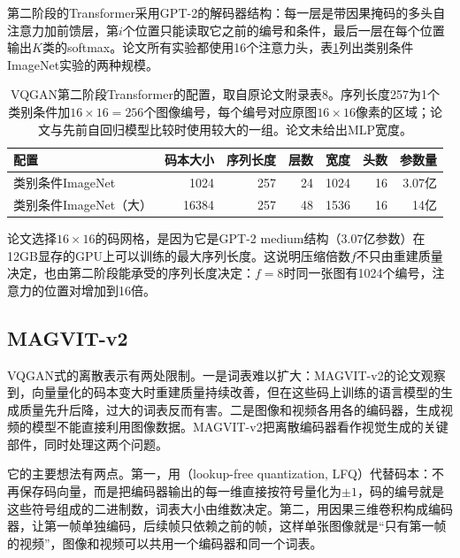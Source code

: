第二阶段的Transformer采用GPT-2的解码器结构：每一层是带因果掩码的多头自注意力加前馈层，第$i$个位置只能读取它之前的编号和条件，最后一层在每个位置输出$K$类的softmax。论文所有实验都使用16个注意力头，表\ref{tab:vision-ivm-vqgan-transformer}列出类别条件ImageNet实验的两种规模。

\begin{table}[tbp]
  \centering
  \small
  \begin{tabular}{@{}lrrrrrr@{}}
    \toprule
    配置 & 码本大小 & 序列长度 & 层数 & 宽度 & 头数 & 参数量\\
    \midrule
    类别条件ImageNet & 1024 & 257 & 24 & 1024 & 16 & 3.07亿\\
    类别条件ImageNet（大） & 16384 & 257 & 48 & 1536 & 16 & 14亿\\
    \bottomrule
  \end{tabular}
  \caption{VQGAN第二阶段Transformer的配置，取自原论文附录表8。序列长度257为1个类别条件加$16\times16=256$个图像编号，每个编号对应原图$16\times16$像素的区域；论文与先前自回归模型比较时使用较大的一组。论文未给出MLP宽度。}
  \label{tab:vision-ivm-vqgan-transformer}
\end{table}

论文选择$16\times16$的码网格，是因为它是GPT-2 medium结构（3.07亿参数）在12GB显存的GPU上可以训练的最大序列长度。这说明压缩倍数$f$不只由重建质量决定，也由第二阶段能承受的序列长度决定：$f=8$时同一张图有1024个编号，注意力的位置对增加到16倍。

\subsection{MAGVIT-v2}
\label{sec:vision-ivm-magvit2}

VQGAN式的离散表示有两处限制。一是词表难以扩大：MAGVIT-v2的论文观察到，向量量化的码本变大时重建质量持续改善，但在这些码上训练的语言模型的生成质量先升后降，过大的词表反而有害。二是图像和视频各用各的编码器，生成视频的模型不能直接利用图像数据。MAGVIT-v2把离散编码器看作视觉生成的关键部件，同时处理这两个问题。

它的主要想法有两点。第一，用（lookup-free quantization, LFQ）代替码本：不再保存码向量，而是把编码器输出的每一维直接按符号量化为$\pm1$，码的编号就是这些符号组成的二进制数，词表大小由维数决定。第二，用因果三维卷积构成编码器，让第一帧单独编码，后续帧只依赖之前的帧，这样单张图像就是“只有第一帧的视频”，图像和视频可以共用一个编码器和同一个词表。

